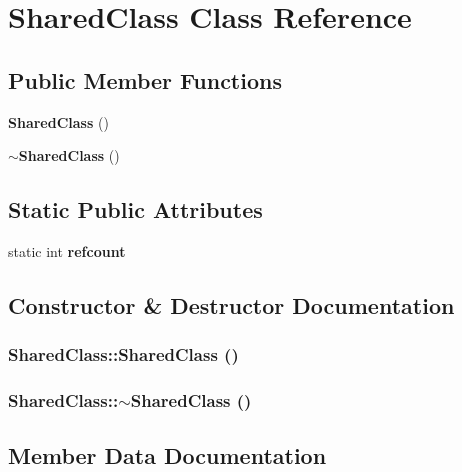 \section{Shared\-Class Class Reference}
\label{class_shared_class}
\subsection*{Public Member Functions}
\begin{CompactItemize}
\item 
{\bf Shared\-Class} ()
\item 
{\bf $\sim$Shared\-Class} ()
\end{CompactItemize}
\subsection*{Static Public Attributes}
\begin{CompactItemize}
\item 
static int {\bf refcount}
\end{CompactItemize}


\subsection{Constructor \& Destructor Documentation}
\subsubsection{\setlength{\rightskip}{0pt plus 5cm}Shared\-Class::Shared\-Class ()\hspace{0.3cm}{\tt  [inline]}}\label{class_shared_class_bfddb4c6d972719a62511da60af003e0}


\subsubsection{\setlength{\rightskip}{0pt plus 5cm}Shared\-Class::$\sim$Shared\-Class ()\hspace{0.3cm}{\tt  [inline]}}\label{class_shared_class_d875cf37074a3077cb283d378ed835a9}




\subsection{Member Data Documentation}
